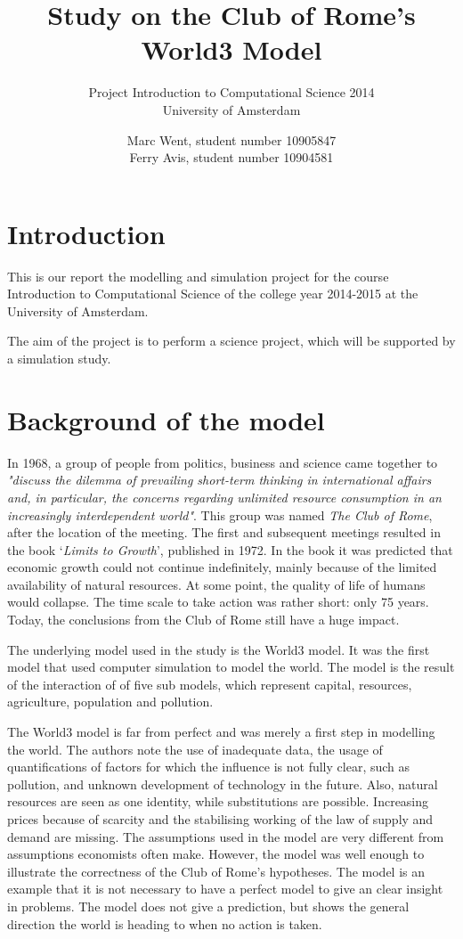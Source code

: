 \documentclass[10pt,a4paper]{scrartcl}
\title{Study on the Club of Rome's World3 Model}
\subtitle{Project Introduction to Computational Science 2014\\
University of Amsterdam}
\author{Marc Went, student number 10905847\\Ferry Avis, student number 10904581}
\begin{document}
\maketitle

\section*{Introduction}

This is our report the modelling and simulation project for the course Introduction to Computational Science of the college year 2014-2015 at the University of Amsterdam.

The aim of the project is to perform a science project, which will be supported by a simulation study. 

\section*{Background of the model}

In 1968, a group of people from politics, business and science came together to \emph{"discuss the dilemma of prevailing short-term thinking in international affairs and, in particular, the concerns regarding unlimited resource consumption in an increasingly interdependent world"}. This group was named \emph{The Club of Rome}, after the location of the meeting. The first and subsequent meetings resulted in the book `\emph{Limits to Growth}', published in 1972. In the book it was predicted that economic growth could not continue indefinitely, mainly because of the limited availability of natural resources. At some point, the quality of life of humans would collapse. The time scale to take action was rather short: only 75 years. Today, the conclusions from the Club of Rome still have a huge impact.

The underlying model used in the study is the World3 model. It was the first model that used computer simulation to model the world. The model is the result of the interaction of of five sub models, which represent capital, resources, agriculture, population and pollution.

The World3 model is far from perfect and was merely a first step in modelling the world. The authors note the use of inadequate data, the usage of quantifications of factors for which the influence is not fully clear, such as pollution, and unknown development of technology in the future. Also, natural resources are seen as one identity, while substitutions are possible. Increasing prices because of scarcity and the stabilising working of the law of supply and demand are missing. The assumptions used in the model are very different from assumptions economists often make. However, the model was well enough to illustrate the correctness of the Club of Rome's hypotheses. The model is an example that it is not necessary to have a perfect model to give an clear insight in problems. The model does not give a prediction, but shows the general direction the world is heading to when no action is taken.
\end{document}
